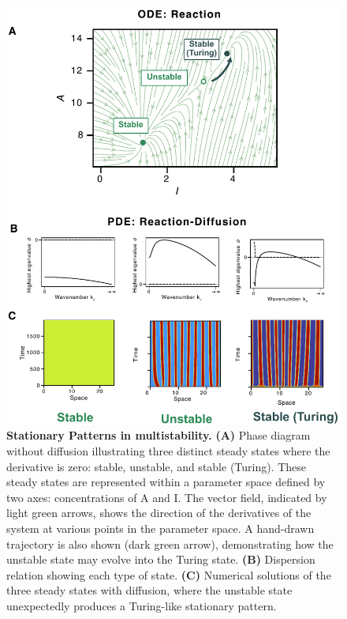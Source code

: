 \begin{figure}[H]
    \includegraphics[width=1\textwidth]{figures/multistability1}

    \caption{\textbf{Stationary Patterns in multistability.} \textbf{(A)} Phase diagram without diffusion illustrating three distinct steady states where the derivative is zero: stable, unstable, and stable (Turing). These steady states are represented within a parameter space defined by two axes: concentrations of A and I. The vector field, indicated by light green arrows, shows the direction of the derivatives of the system at various points in the parameter space. A hand-drawn trajectory is also shown (dark green arrow), demonstrating how the unstable state may evolve into the Turing state. \textbf{(B)} Dispersion relation showing each type of state. \textbf{(C)} Numerical solutions of the three steady states with diffusion, where the unstable state unexpectedly produces a Turing-like stationary pattern. }
    \label{fig:multistability1} %
\end{figure}



